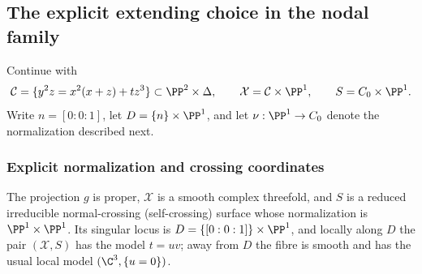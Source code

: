\subsection{The explicit extending choice in the nodal family}
Continue with
\[
\mathcal C=\{y^2z=x^2(x+z)+tz^3\}\subset\PP^2\times\Delta,
\qquad \mathcal X=\mathcal C\times\PP^1,
\qquad S=C_0\times\PP^1.
\]
Write $n=[0:0:1]$, let $D=\{n\}\times\PP^1$, and let
$\nu:\PP^1\to C_0$ denote the normalization described next.
\subsubsection*{Explicit normalization and crossing coordinates}

The projection $g$ is proper, $\mathcal X$ is a smooth complex threefold,
  and $S$ is a reduced irreducible normal-crossing (self-crossing) surface whose normalization
is $\PP^1\times\PP^1$.  Its singular locus is
\(D=\{[0:0:1]\}\times\PP^1\), and locally along $D$ the pair $(\mathcal X,S)$
has the model $t=uv$; away from $D$ the fibre is smooth and has the usual
local model $(\C^3,\{u=0\})$.


